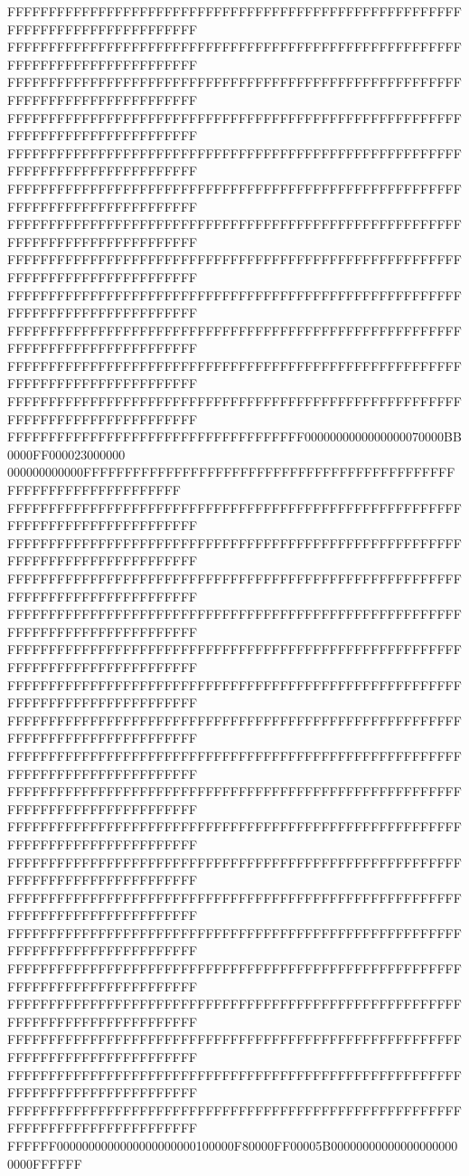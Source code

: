 FFFFFFFFFFFFFFFFFFFFFFFFFFFFFFFFFFFFFFFFFFFFFFFFFFFFFFFFFFFFFFFFFFFFFFFFFFFFFF
FFFFFFFFFFFFFFFFFFFFFFFFFFFFFFFFFFFFFFFFFFFFFFFFFFFFFFFFFFFFFFFFFFFFFFFFFFFFFF
FFFFFFFFFFFFFFFFFFFFFFFFFFFFFFFFFFFFFFFFFFFFFFFFFFFFFFFFFFFFFFFFFFFFFFFFFFFFFF
FFFFFFFFFFFFFFFFFFFFFFFFFFFFFFFFFFFFFFFFFFFFFFFFFFFFFFFFFFFFFFFFFFFFFFFFFFFFFF
FFFFFFFFFFFFFFFFFFFFFFFFFFFFFFFFFFFFFFFFFFFFFFFFFFFFFFFFFFFFFFFFFFFFFFFFFFFFFF
FFFFFFFFFFFFFFFFFFFFFFFFFFFFFFFFFFFFFFFFFFFFFFFFFFFFFFFFFFFFFFFFFFFFFFFFFFFFFF
FFFFFFFFFFFFFFFFFFFFFFFFFFFFFFFFFFFFFFFFFFFFFFFFFFFFFFFFFFFFFFFFFFFFFFFFFFFFFF
FFFFFFFFFFFFFFFFFFFFFFFFFFFFFFFFFFFFFFFFFFFFFFFFFFFFFFFFFFFFFFFFFFFFFFFFFFFFFF
FFFFFFFFFFFFFFFFFFFFFFFFFFFFFFFFFFFFFFFFFFFFFFFFFFFFFFFFFFFFFFFFFFFFFFFFFFFFFF
FFFFFFFFFFFFFFFFFFFFFFFFFFFFFFFFFFFFFFFFFFFFFFFFFFFFFFFFFFFFFFFFFFFFFFFFFFFFFF
FFFFFFFFFFFFFFFFFFFFFFFFFFFFFFFFFFFFFFFFFFFFFFFFFFFFFFFFFFFFFFFFFFFFFFFFFFFFFF
FFFFFFFFFFFFFFFFFFFFFFFFFFFFFFFFFFFFFFFFFFFFFFFFFFFFFFFFFFFFFFFFFFFFFFFFFFFFFF
FFFFFFFFFFFFFFFFFFFFFFFFFFFFFFFFFFFF0000000000000000070000BB0000FF000023000000
000000000000FFFFFFFFFFFFFFFFFFFFFFFFFFFFFFFFFFFFFFFFFFFFFFFFFFFFFFFFFFFFFFFFFF
FFFFFFFFFFFFFFFFFFFFFFFFFFFFFFFFFFFFFFFFFFFFFFFFFFFFFFFFFFFFFFFFFFFFFFFFFFFFFF
FFFFFFFFFFFFFFFFFFFFFFFFFFFFFFFFFFFFFFFFFFFFFFFFFFFFFFFFFFFFFFFFFFFFFFFFFFFFFF
FFFFFFFFFFFFFFFFFFFFFFFFFFFFFFFFFFFFFFFFFFFFFFFFFFFFFFFFFFFFFFFFFFFFFFFFFFFFFF
FFFFFFFFFFFFFFFFFFFFFFFFFFFFFFFFFFFFFFFFFFFFFFFFFFFFFFFFFFFFFFFFFFFFFFFFFFFFFF
FFFFFFFFFFFFFFFFFFFFFFFFFFFFFFFFFFFFFFFFFFFFFFFFFFFFFFFFFFFFFFFFFFFFFFFFFFFFFF
FFFFFFFFFFFFFFFFFFFFFFFFFFFFFFFFFFFFFFFFFFFFFFFFFFFFFFFFFFFFFFFFFFFFFFFFFFFFFF
FFFFFFFFFFFFFFFFFFFFFFFFFFFFFFFFFFFFFFFFFFFFFFFFFFFFFFFFFFFFFFFFFFFFFFFFFFFFFF
FFFFFFFFFFFFFFFFFFFFFFFFFFFFFFFFFFFFFFFFFFFFFFFFFFFFFFFFFFFFFFFFFFFFFFFFFFFFFF
FFFFFFFFFFFFFFFFFFFFFFFFFFFFFFFFFFFFFFFFFFFFFFFFFFFFFFFFFFFFFFFFFFFFFFFFFFFFFF
FFFFFFFFFFFFFFFFFFFFFFFFFFFFFFFFFFFFFFFFFFFFFFFFFFFFFFFFFFFFFFFFFFFFFFFFFFFFFF
FFFFFFFFFFFFFFFFFFFFFFFFFFFFFFFFFFFFFFFFFFFFFFFFFFFFFFFFFFFFFFFFFFFFFFFFFFFFFF
FFFFFFFFFFFFFFFFFFFFFFFFFFFFFFFFFFFFFFFFFFFFFFFFFFFFFFFFFFFFFFFFFFFFFFFFFFFFFF
FFFFFFFFFFFFFFFFFFFFFFFFFFFFFFFFFFFFFFFFFFFFFFFFFFFFFFFFFFFFFFFFFFFFFFFFFFFFFF
FFFFFFFFFFFFFFFFFFFFFFFFFFFFFFFFFFFFFFFFFFFFFFFFFFFFFFFFFFFFFFFFFFFFFFFFFFFFFF
FFFFFFFFFFFFFFFFFFFFFFFFFFFFFFFFFFFFFFFFFFFFFFFFFFFFFFFFFFFFFFFFFFFFFFFFFFFFFF
FFFFFFFFFFFFFFFFFFFFFFFFFFFFFFFFFFFFFFFFFFFFFFFFFFFFFFFFFFFFFFFFFFFFFFFFFFFFFF
FFFFFFFFFFFFFFFFFFFFFFFFFFFFFFFFFFFFFFFFFFFFFFFFFFFFFFFFFFFFFFFFFFFFFFFFFFFFFF
FFFFFFFFFFFFFFFFFFFFFFFFFFFFFFFFFFFFFFFFFFFFFFFFFFFFFFFFFFFFFFFFFFFFFFFFFFFFFF
FFFFFF0000000000000000000000100000F80000FF00005B000000000000000000000000FFFFFF
